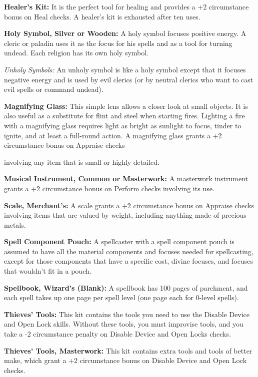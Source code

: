 \documentclass{article}
\begin{document}
\textbf{Healer's Kit: }It is the perfect tool for healing and provides a +2 circumstance 
bonus on Heal checks. A healer's kit is exhausted after ten uses.

\textbf{Holy Symbol, Silver or Wooden: }A holy symbol focuses positive energy. 
A cleric or paladin uses it as the focus for his spells and as a tool for turning 
undead. Each religion has its own holy symbol.

\textit{Unholy Symbols: }An unholy symbol is like a holy symbol except that it 
focuses negative energy and is used by evil clerics (or by neutral clerics who 
want to cast evil spells or command undead).

\textbf{Magnifying Glass:} This simple lens allows a closer look at small objects. 
It is also useful as a substitute for flint and steel when starting fires. Lighting 
a fire with a magnifying glass requires light as bright as sunlight to focus, tinder 
to ignite, and at least a full-round action. A magnifying glass grants a +2 circumstance 
bonus on Appraise checks

involving any item that is small or highly detailed.

\textbf{Musical Instrument, Common or Masterwork:} A masterwork instrument grants 
a +2 circumstance bonus on Perform checks involving its use.

\textbf{Scale, Merchant's: }A scale grants a +2 circumstance bonus on Appraise 
checks involving items that are valued by weight, including anything made of precious 
metals.

\textbf{Spell Component Pouch: }A spellcaster with a spell component pouch is assumed 
to have all the material components and focuses needed for spellcasting, except 
for those components that have a specific cost, divine focuses, and focuses that 
wouldn't fit in a pouch.

\textbf{Spellbook, Wizard's (Blank):} A spellbook has 100 pages of parchment, and 
each spell takes up one page per spell level (one page each for 0-level spells).

\textbf{Thieves' Tools: }This kit contains the tools you need to use the Disable 
Device and Open Lock skills. Without these tools, you must improvise tools, and 
you take a -2 circumstance penalty on Disable Device and Open Locks checks.

\textbf{Thieves' Tools, Masterwork:} This kit contains extra tools and tools of 
better make, which grant a +2 circumstance bonus on Disable Device and Open Lock 
checks.
\end{document}
